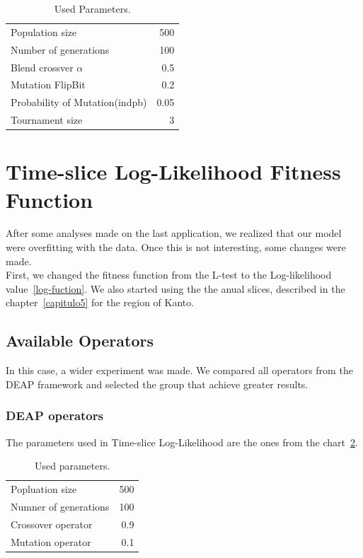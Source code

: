 \begin{table}[!h]
  \begin{center}
  \begin{tabular}{|l|r|}
    \hline
    Population size & 500\\
   	Number of generations & 100\\
    Blend crossver $\alpha$ & 0.5\\
    Mutation FlipBit & 0.2\\
    Probability of Mutation(indpb) & 0.05 \\
    Tournament size & 3\\
    \hline    
  \end{tabular}
  \end{center}
  \caption{Used Parameters.}
  \label{GAParameters-Ltest}
\end{table}

\section{Time-slice Log-Likelihood Fitness Function}
After some analyses made on the last application, we realized that our model were overfitting with the data. Once this is not interesting, some changes were made.\\

First, we changed the fitness function from the L-test to the Log-likelihood value~\ref{log-fuction}. We also started using the the anual slices, described in the chapter~\ref{capitulo5} for the region of Kanto.\\


\subsection{Available Operators}
In this case, a wider experiment was made. We compared all operators from the DEAP framework and selected the group that achieve greater results.\\ 

\subsubsection{DEAP operators}

The parameters used in Time-slice Log-Likelihood are the ones from the chart~\ref{GAParameters-2}.\\

\begin{table}[!h]
  \begin{center}
  \begin{tabular}{|l|r|}
    \hline
    Popluation size & 500\\
    Numner of generations & 100\\
    Crossover operator & 0.9\\
    Mutation operator & 0.1\\
    \hline    
  \end{tabular}
  \end{center}
  \caption{Used parameters.}
  \label{GAParameters-2}
\end{table}

